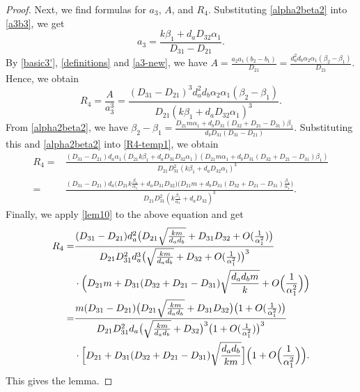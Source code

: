 \documentclass[12pt]{article}
\begin{document}
\begin{proof}
Next, we find formulas for $a_3$, $A$, and $R_4$. Substituting \eqref{alpha2beta2} into \eqref{a3b3}, we get
\begin{equation} \label{a3-new}
a_3 = \frac{k \beta_1 + d_a D_{32} \alpha_1}{D_{31} - D_{21}}.
\end{equation}
By \eqref{basic3'}, \eqref{definitions} and \eqref{a3-new}, we have $A = \frac{a_2 a_1 (b_2 - b_1)}{D_{21}} = \frac{d_a^2 d_b \alpha_2 \alpha_1 (\beta_2 - \beta_1)}{D_{21}}$. Hence, we obtain
\begin{equation} \label{R4-temp1}
R_4 = \frac{A}{a_3^3} = \frac{(D_{31} - D_{21})^3 d_a^2 d_b \alpha_2 \alpha_1 (\beta_2 - \beta_1)}{D_{21} (k \beta_1 + d_a D_{32} \alpha_1)^3}.
\end{equation}
From \eqref{alpha2beta2}, we have $\beta_2 - \beta_1 = \frac{D_{21} m \alpha_1 + d_b D_{31} (D_{32} + D_{21} - D_{31}) \beta_1}{d_b D_{31} (D_{31} - D_{21})}$. Substituting this and \eqref{alpha2beta2} into \eqref{R4-temp1}, we obtain
\begin{align*}
R_4 =& \frac{(D_{31} - D_{21}) d_a \alpha_1 (D_{21} k \beta_1 + d_a D_{31} D_{32} \alpha_1) (D_{21} m \alpha_1 + d_b D_{31} (D_{32} + D_{21} - D_{31}) \beta_1)}{D_{21} D_{31}^2 (k \beta_1 + d_a D_{32} \alpha_1)^3} \\
=& \frac{(D_{31} - D_{21}) d_a \bigl( D_{21} k \frac{\beta_1}{\alpha_1} + d_a D_{31} D_{32} \bigr) \bigl(D_{21} m + d_b D_{31} (D_{32} + D_{21} - D_{31}) \frac{\beta_1}{\alpha_1} \bigr)}{D_{21} D_{31}^2 (k \frac{\beta_1}{\alpha_1} + d_a D_{32})^3}.
\end{align*}
Finally, we apply \eqref{lem10} to the above equation and get
\begin{align*}
R_4 =& \frac{(D_{31} - D_{21}) d_a^2 \bigl( D_{21} \sqrt{\frac{k m}{d_a d_b}} + D_{31} D_{32} + O( \frac{1}{\alpha_1^2} ) \bigr)}{D_{21} D_{31}^2 d_a^3 \bigl(\sqrt{\frac{k m}{d_a d_b}} + D_{32} + O( \frac{1}{\alpha_1^2} ) \bigr)^3} \\
&\cdot  \Bigl(D_{21} m + D_{31} (D_{32} + D_{21} - D_{31}) \sqrt{\frac{d_a d_b m}{k}} + O \Bigl( \frac{1}{\alpha_1^2} \Bigr) \Bigr) \\
=& \frac{m (D_{31} - D_{21}) \bigl( D_{21} \sqrt{\frac{k m}{d_a d_b}} + D_{31} D_{32} \bigr) \bigl( 1 + O( \frac{1}{\alpha_1^2} ) \bigr)}{D_{21} D_{31}^2 d_a \bigl(\sqrt{\frac{k m}{d_a d_b}} + D_{32} \bigr)^3 \bigl( 1 + O( \frac{1}{\alpha_1^2} ) \bigr)^3} \\
&\cdot  \Bigl[ D_{21} + D_{31} (D_{32} + D_{21} - D_{31}) \sqrt{\frac{d_a d_b}{k m}} \Bigr] \Bigl(1 + O \Bigl( \frac{1}{\alpha_1^2} \Bigr)  \Bigr).
\end{align*}
This gives the lemma.
\end{proof}
\end{document}
